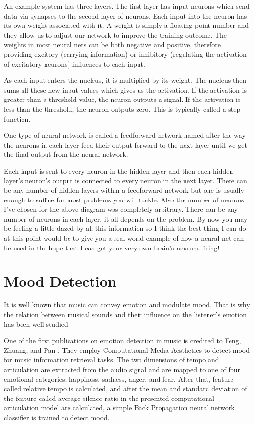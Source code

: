 An example system has three layers. The first layer has input neurons which send data via synapses to the second layer of neurons. Each input into the neuron has its own weight associated with it. A weight is simply a floating point number and they allow us to adjust our network to improve the training outcome. The weights in most neural nets can be both negative and positive, therefore providing excitory (carrying information) or inhibitory (regulating the activation of excitatory neurons) influences to each input. 

As each input enters the nucleus, it is multiplied by its weight. The nucleus then sums all these new input values which gives us the activation. If the activation is greater than a threshold value, the neuron outputs a signal. If the activation is less than the threshold, the neuron outputs zero. This is typically called a step function.


One type of neural network is called a feedforward network named after the way the neurons in each layer feed their output forward to the next layer until we get the final output from the neural network. 
 
Each input is sent to every neuron in the hidden layer and then each hidden layer’s neuron’s output is connected to every neuron in the next layer. There can be any number of hidden layers within a feedforward network but one is usually enough to suffice for most problems you will tackle. Also the number of neurons I've chosen for the above diagram was completely arbitrary. There can be any number of neurons in each layer, it all depends on the problem. By now you may be feeling a little dazed by all this information so I think the best thing I can do at this point would be to give you a real world example of how a neural net can be used in the hope that I can get your very own brain’s neurons firing!
 
\vspace{20pt}


\section{Mood Detection}
It is well known that music can convey emotion and modulate mood. That is why the relation between musical sounds and their influence on the listener’s emotion has been well studied.

One of the first publications on emotion detection in music is credited to Feng, Zhuang, and Pan \cite{moodold}. They employ Computational Media Aesthetics to detect mood for music information retrieval tasks. The two dimensions of tempo and articulation are extracted from the audio signal and are mapped to one of four emotional categories; happiness, sadness, anger, and fear. 
After that, feature called relative tempo is calculated, and after the mean and standard deviation of the feature called average silence ratio in the presented computational articulation model are calculated, a simple Back Propagation neural network classifier is trained to detect mood.

